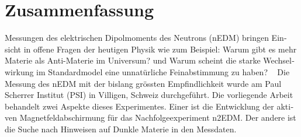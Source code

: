 

\begingroup
\let\clearpage\relax
\let\cleardoublepage\relax
\let\cleardoublepage\relax

\chapter*{Zusammenfassung} %

\newcommand{\jkfootnote}[1]{\footnote{#1}}

\begin{otherlanguage}{ngerman}

Messungen des elektrischen Dipolmoments des Neutrons (nEDM) bringen Einsicht in offene Fragen der heutigen Physik wie zum Beispiel: \glqq{}Warum gibt es mehr Materie als Anti-Materie im Universum?\grqq{} und \glqq{}Warum scheint die starke Wechselwirkung im Standardmodel eine unnatürliche Feinabstimmung zu haben?\grqq{} \  %
Die Messung des nEDM mit der bislang grössten Empfindlichkeit wurde am Paul Scherrer Institut (PSI) in Villigen, Schweiz durchgeführt.
Die vorliegende Arbeit behandelt zwei Aspekte dieses Experimentes. Einer ist die Entwicklung der aktiven Magnetfeldabschirmung  für das Nachfolgeexperiment n2EDM\@.
Der andere ist die Suche nach Hinweisen auf Dunkle Materie in den Messdaten.


\end{otherlanguage}
